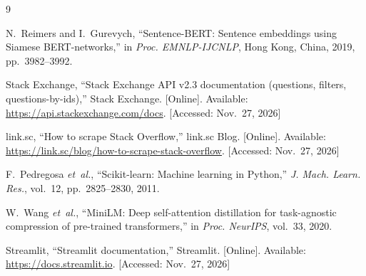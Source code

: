 \begin{thebibliography}{9}\small

 N.~Reimers and I.~Gurevych, ``Sentence-BERT: Sentence embeddings using
  Siamese BERT-networks,'' in \textit{Proc. EMNLP-IJCNLP}, Hong Kong, China, 2019, pp.~3982--3992.

 Stack Exchange, ``Stack Exchange API v2.3 documentation (questions, filters,
  questions-by-ids),'' Stack Exchange. [Online]. Available:
  \url{https://api.stackexchange.com/docs}. [Accessed: Nov.~27, 2026]

 link.sc, ``How to scrape Stack Overflow,'' link.sc Blog. [Online]. Available:
  \url{https://link.sc/blog/how-to-scrape-stack-overflow}. [Accessed: Nov.~27, 2026]

 F.~Pedregosa \textit{et~al.}, ``Scikit-learn: Machine learning in Python,''
  \textit{J. Mach. Learn. Res.}, vol.~12, pp.~2825--2830, 2011.

 W.~Wang \textit{et~al.}, ``MiniLM: Deep self-attention distillation for
  task-agnostic compression of pre-trained transformers,'' in \textit{Proc. NeurIPS}, vol.~33, 2020.

 Streamlit, ``Streamlit documentation,'' Streamlit. [Online]. Available:
  \url{https://docs.streamlit.io}. [Accessed: Nov.~27, 2026]

\end{thebibliography}
